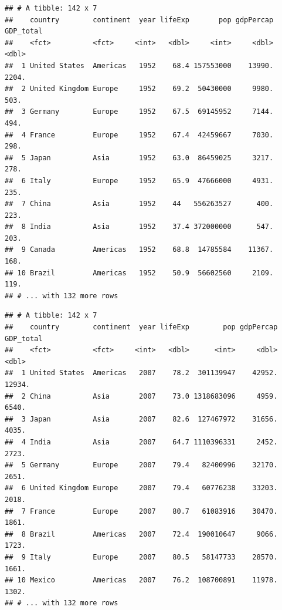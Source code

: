 \documentclass[12pt,]{article}
\newenvironment{Shaded}{\begin{snugshade}}{\end{snugshade}}
\newcommand{\KeywordTok}[1]{\textcolor[rgb]{0.13,0.29,0.53}{\textbf{#1}}}
\newcommand{\DecValTok}[1]{\textcolor[rgb]{0.00,0.00,0.81}{#1}}
\newcommand{\StringTok}[1]{\textcolor[rgb]{0.31,0.60,0.02}{#1}}
\newcommand{\OperatorTok}[1]{\textcolor[rgb]{0.81,0.36,0.00}{\textbf{#1}}}
\newcommand{\NormalTok}[1]{#1}
\begin{document}
\begin{verbatim}
## # A tibble: 142 x 7
##    country        continent  year lifeExp       pop gdpPercap GDP_total
##    <fct>          <fct>     <int>   <dbl>     <int>     <dbl>     <dbl>
##  1 United States  Americas   1952    68.4 157553000    13990.     2204.
##  2 United Kingdom Europe     1952    69.2  50430000     9980.      503.
##  3 Germany        Europe     1952    67.5  69145952     7144.      494.
##  4 France         Europe     1952    67.4  42459667     7030.      298.
##  5 Japan          Asia       1952    63.0  86459025     3217.      278.
##  6 Italy          Europe     1952    65.9  47666000     4931.      235.
##  7 China          Asia       1952    44   556263527      400.      223.
##  8 India          Asia       1952    37.4 372000000      547.      203.
##  9 Canada         Americas   1952    68.8  14785584    11367.      168.
## 10 Brazil         Americas   1952    50.9  56602560     2109.      119.
## # ... with 132 more rows
\end{verbatim}

\begin{Shaded}
\end{Shaded}

\begin{verbatim}
## # A tibble: 142 x 7
##    country        continent  year lifeExp        pop gdpPercap GDP_total
##    <fct>          <fct>     <int>   <dbl>      <int>     <dbl>     <dbl>
##  1 United States  Americas   2007    78.2  301139947    42952.    12934.
##  2 China          Asia       2007    73.0 1318683096     4959.     6540.
##  3 Japan          Asia       2007    82.6  127467972    31656.     4035.
##  4 India          Asia       2007    64.7 1110396331     2452.     2723.
##  5 Germany        Europe     2007    79.4   82400996    32170.     2651.
##  6 United Kingdom Europe     2007    79.4   60776238    33203.     2018.
##  7 France         Europe     2007    80.7   61083916    30470.     1861.
##  8 Brazil         Americas   2007    72.4  190010647     9066.     1723.
##  9 Italy          Europe     2007    80.5   58147733    28570.     1661.
## 10 Mexico         Americas   2007    76.2  108700891    11978.     1302.
## # ... with 132 more rows
\end{verbatim}
\end{document}
